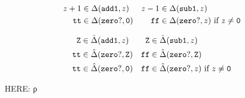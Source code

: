 \documentclass[preprint,onecolumn,9pt]{sigplanconf} %
\begin{document}
\begin{align*}
z+1 &\in \Delta({\tt add1},z) &
z-1 &\in \Delta({\tt sub1},z)\\
{\tt tt} &\in \Delta({\tt zero?},{\tt 0}) &
{\tt ff} &\in \Delta({\tt zero?},z)\text{ if }z\neq {\tt 0}\\
\end{align*}

\begin{align*}
{\tt Z} &\in \hat{\Delta}({\tt add1},z) &
{\tt Z} &\in \hat{\Delta}({\tt sub1},z)\\
{\tt tt} &\in \hat{\Delta}({\tt zero?},{\tt Z}) &
{\tt ff} &\in \hat{\Delta}({\tt zero?},{\tt Z})\\
{\tt tt} &\in \hat{\Delta}({\tt zero?},{\tt 0}) &
{\tt ff} &\in \hat{\Delta}({\tt zero?},z)\text{ if }z\neq {\tt 0}\\
\end{align*}

HERE: ρ
\end{document}
